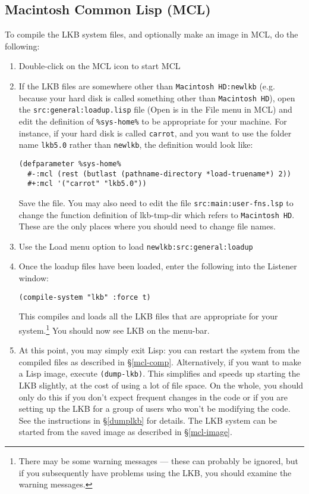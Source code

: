 \documentclass[12pt]{report}
\begin{document}
\subsection{Macintosh Common Lisp (MCL)}
To compile the LKB system files, and optionally make an image
in MCL, do the following:
\begin{enumerate}
\item Double-click on the MCL icon to start MCL
\item If the LKB files are somewhere other than \verb+Macintosh HD:newlkb+
(e.g. because your hard disk is called something other than 
\verb+Macintosh HD+),
open the \verb+src:general:loadup.lisp+ file (Open is in the File menu 
in MCL) and edit the definition of \verb+%sys-home%+ to be appropriate
for your machine.  For instance, if your hard disk is called \verb+carrot+,
and you want to use the folder name \verb+lkb5.0+ rather than \verb+newlkb+,
the definition would look like:
\begin{verbatim}
(defparameter %sys-home%
  #-:mcl (rest (butlast (pathname-directory *load-truename*) 2))
  #+:mcl '("carrot" "lkb5.0"))
\end{verbatim}
Save the file.
You may also need to edit the file \verb+src:main:user-fns.lsp+ to
change the function definition of lkb-tmp-dir which refers to
\verb+Macintosh HD+.  These are the only places where you should need to
change file names.
\item Use the Load menu option to load \verb+newlkb:src:general:loadup+
\item Once the loadup files have been loaded, enter the following into the
Listener window:
\begin{verbatim}
(compile-system "lkb" :force t)
\end{verbatim}
This compiles and loads all the LKB files that are appropriate for
your system.\footnote{There may be
some warning messages --- these can probably be ignored, but if you subsequently
have problems using the LKB, you should examine the
warning messages.}
You
should now see LKB on the menu-bar.
\item
At this point, you may simply exit Lisp:
you can restart the system from the compiled files
as described in \S\ref{mcl-comp}.
Alternatively, if you want to make a Lisp image, execute \verb+(dump-lkb)+.
This simplifies and speeds up starting the LKB slightly, at the cost of
using a lot of file space.
On the whole, you should only do this if you don't expect
frequent changes in the code or if you are setting up the LKB for
a group of users who won't be modifying the code.
See the instructions in \S\ref{dumplkb} for details.
The LKB system can be started from the saved image as described in 
\S\ref{mcl-image}.
\end{enumerate}
\end{document}
